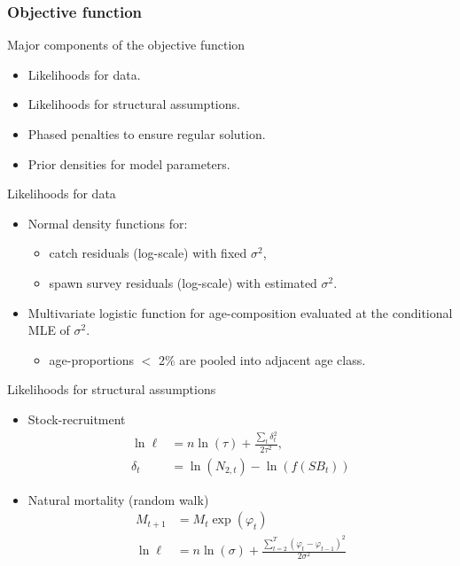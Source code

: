 \begin{frame}[t,allowframebreaks]\frametitle{Objective function}
	\begin{block}
		{Major components of the objective function}
		\begin{itemize}
			\item Likelihoods for data.
			\item Likelihoods for structural assumptions.
			\item Phased penalties to ensure regular solution.
			\item Prior densities for model parameters.
		\end{itemize}
	\end{block}
	\framebreak
	
	\begin{block}	
		{Likelihoods for data}
		\begin{itemize}
			\item Normal density functions for:
			\begin{itemize}
				\item catch residuals (log-scale) with fixed $\sigma^2$,
				\item spawn survey residuals (log-scale) with estimated $\sigma^2$. 
			\end{itemize}
			\item Multivariate logistic function for age-composition evaluated at the conditional MLE of $\sigma^2$.
			\begin{itemize}
				\item age-proportions $<$ 2\% are pooled into adjacent age class. 
			\end{itemize}
		\end{itemize}
	\end{block}
	
	\framebreak
	\begin{block}
		{Likelihoods for structural assumptions}
		\begin{itemize}
			\item Stock-recruitment \\ 
			\begin{align}
				\ln\ell &= n\ln(\tau) + \frac{\sum_t \delta_t^2}{2\tau^2},\nonumber\\
				\delta_t &= \ln(N_{2,t}) - \ln(f(SB_t))\nonumber
			\end{align}
			\item Natural mortality (random walk)\\
			\begin{align}
				M_{t+1} &= M_t \exp(\varphi_t) \nonumber \\
				\ln\ell &= n\ln(\sigma) + \frac{\sum_{t=2}^T (\varphi_t-\varphi_{t-1})^2}{2\sigma^2}\nonumber
			\end{align}
		\end{itemize}
	\end{block}
	

\end{frame}
